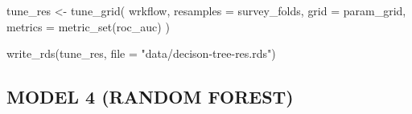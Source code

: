 \documentclass[
]{article}
\newenvironment{Shaded}{\begin{snugshade}}{\end{snugshade}}
\newcommand{\AttributeTok}[1]{\textcolor[rgb]{0.77,0.63,0.00}{#1}}
\newcommand{\DecValTok}[1]{\textcolor[rgb]{0.00,0.00,0.81}{#1}}
\newcommand{\FunctionTok}[1]{\textcolor[rgb]{0.00,0.00,0.00}{#1}}
\newcommand{\NormalTok}[1]{#1}
\newcommand{\OtherTok}[1]{\textcolor[rgb]{0.56,0.35,0.01}{#1}}
\newcommand{\SpecialCharTok}[1]{\textcolor[rgb]{0.00,0.00,0.00}{#1}}
\newcommand{\StringTok}[1]{\textcolor[rgb]{0.31,0.60,0.02}{#1}}
\begin{document}
\begin{Shaded}
\begin{Highlighting}[]
\NormalTok{tune\_res }\OtherTok{\textless{}{-}} \FunctionTok{tune\_grid}\NormalTok{(}
\NormalTok{  wrkflow, }
  \AttributeTok{resamples =}\NormalTok{ survey\_folds, }
  \AttributeTok{grid =}\NormalTok{ param\_grid, }
  \AttributeTok{metrics =} \FunctionTok{metric\_set}\NormalTok{(roc\_auc)}
\NormalTok{)}

\FunctionTok{write\_rds}\NormalTok{(tune\_res, }\AttributeTok{file =} \StringTok{"data/decison{-}tree{-}res.rds"}\NormalTok{)}
\end{Highlighting}
\end{Shaded}

\begin{Shaded}
\end{Shaded}

\hypertarget{model-4-random-forest}{%
\subsection{MODEL 4 (RANDOM FOREST)}\label{model-4-random-forest}}
\end{document}
